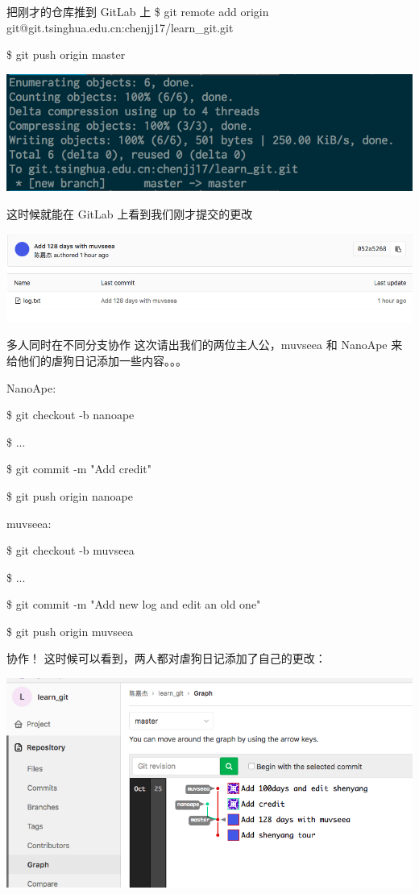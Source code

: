 \documentclass{beamer}
\begin{document}
\begin{frame}{把刚才的仓库推到 GitLab 上}
    \$ git remote add origin git@git.tsinghua.edu.cn:chenjj17/learn\_git.git
    
    \$ git push origin master

    \includegraphics[width=\linewidth]{2018-10-25-11-59-01.png}

    这时候就能在 GitLab 上看到我们刚才提交的更改

    \includegraphics[width=\linewidth]{2018-10-25-12-02-10.png}
\end{frame}

\begin{frame}{多人同时在不同分支协作}
    这次请出我们的两位主人公，muvseea 和 NanoApe 来给他们的虐狗日记添加一些内容。。。

    NanoApe:

    \$ git checkout -b nanoape

    \$ ...

    \$ git commit -m "Add credit"

    \$ git push origin nanoape

    muvseea:

    \$ git checkout -b muvseea

    \$ ...

    \$ git commit -m "Add new log and edit an old one"

    \$ git push origin muvseea
\end{frame}

\begin{frame}{协作！}
    这时候可以看到，两人都对虐狗日记添加了自己的更改：

    \includegraphics[width=\linewidth]{2018-10-25-13-09-01.png}
\end{frame}
\end{document}
